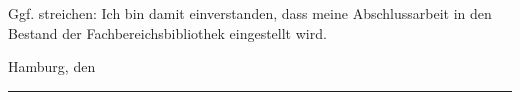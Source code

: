 \documentclass[
    fontsize=12pt,
    headings=small,
    parskip=half,           %
    bibliography=totoc,
    numbers=noenddot,       %
    open=any,               %
    ]{scrreprt}
\begin{document}
Ggf. streichen: Ich bin damit einverstanden, dass meine Abschlussarbeit in den Bestand der Fachbereichsbibliothek eingestellt wird.

\makeatletter
Hamburg, den {\@date}
\makeatother

\vspace{2cm}
\rule{6cm}{0.25pt}\\
\makeatletter
{\@author} \par
\makeatother


\newpage
\thispagestyle{empty}
%

\end{document}
